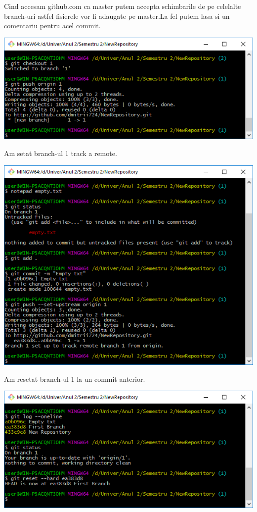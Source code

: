 Cind accesam github.com ca master putem accepta schimbarile de pe celelalte branch-uri astfel fisierele vor fi adaugate pe master.La fel putem lasa si un comentariu pentru acel commit.\\
\begin{center}
\includegraphics[scale=0.75]{images/11}\\
\end{center}

Am setat branch-ul 1 track a remote.\\
\begin{center}
\includegraphics[scale=0.75]{images/12}\\
\end{center}

Am resetat branch-ul 1 la un commit anterior.\\
\begin{center}
\includegraphics[scale=0.75]{images/13}\\
\end{center}

